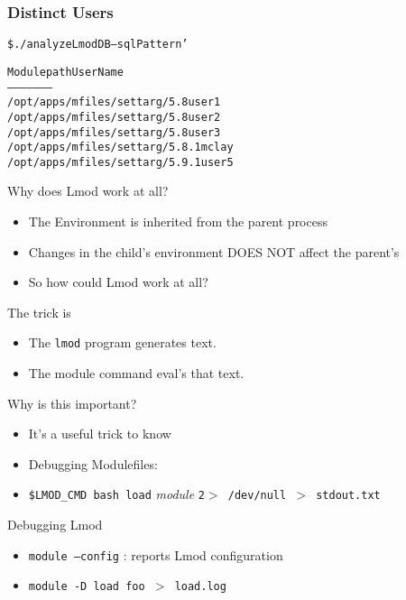 \documentclass[dvipsnames,aspectratio=169]{beamer}
\begin{document}
\begin{frame}[fragile]
    \frametitle{Distinct Users}
  {\small
    \begin{alltt}
\$ ./analyzeLmodDB --sqlPattern '%/settarg/%' usernames

Module path                       User Name
-----------                       ---------
/opt/apps/mfiles/settarg/5.8      user1
/opt/apps/mfiles/settarg/5.8      user2
/opt/apps/mfiles/settarg/5.8      user3
/opt/apps/mfiles/settarg/5.8.1    mclay
/opt/apps/mfiles/settarg/5.9.1    user5
    \end{alltt}
}
\end{frame}

\begin{frame}{Why does Lmod work at all?}
  \begin{itemize}
    \item The Environment is inherited from the parent process
    \item Changes in the child's environment DOES NOT affect the
      parent's
    \item So how could Lmod work at all? 
  \end{itemize}
\end{frame}

\begin{frame}{The trick is}
  \begin{itemize}
    \item The \texttt{lmod} program generates text.
    \item The module command eval's that text.
  \end{itemize}
\end{frame}

\begin{frame}{Why is this important?}
  \begin{itemize}
    \item It's a useful trick to know
    \item Debugging Modulefiles:
    \item \texttt{\$LMOD\_CMD bash load} \emph{module} \texttt{2$>$
        /dev/null $>$ stdout.txt}
  \end{itemize}
\end{frame}

\begin{frame}{Debugging Lmod}
  \begin{itemize}
    \item \texttt{module --config} : reports Lmod configuration
    \item \texttt{module -D load foo $>$ load.log}
  \end{itemize}
\end{frame}
\end{document}
